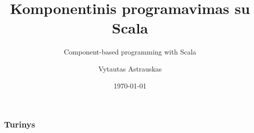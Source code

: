 \documentclass[xetex,mathserif,serif]{beamer}
\title{Komponentinis programavimas su Scala}
\subtitle{Component-based programming with Scala}
\author{Vytautas Astrauskas}
\institute{
Vilniaus universitetas\\
Matematikos ir informatikos fakultetas\\
Programų sistemų katedra%
}
\date{\today}
\begin{document}
  \frame{\titlepage}

  \begin{frame}
  \frametitle{Turinys}
  \tableofcontents[hideallsubsections]
  \end{frame}

  
\end{document}
